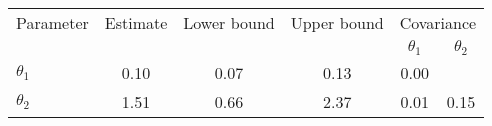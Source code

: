 \begin{tabular}{l|ccc|cc} \hline \hline 
Parameter & Estimate & Lower bound & Upper bound & \multicolumn{2}{c}{Covariance}  \\& & & & $\theta_1$ & $\theta_2$ \\ \hline 
$\theta_1$ & 0.10 & 0.07 & 0.13 & 0.00 & \\ 
$\theta_2$ & 1.51 & 0.66 & 2.37 & 0.01 & 0.15 \\ 
\hline \hline 
\end{tabular} 
